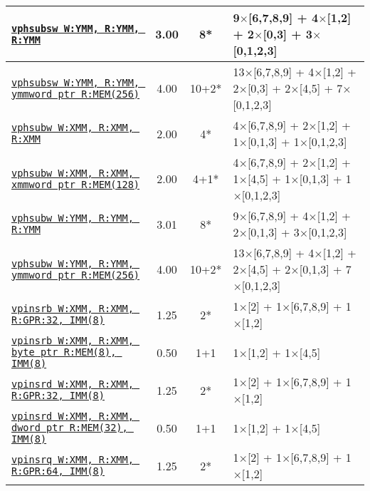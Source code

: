 \documentclass[a4paper,english,fontsize=9]{scrartcl}
\begin{document}
\begin{longtable}{p{}ccL{.25\textwidth}}
  \midrule
  \texttt{\href{https://felixcloutier.com/x86/PHSUBSW.html}{vphsubsw W:YMM, R:YMM, R:YMM}} & 3.00 & 8* & 9\(\times\)[6,7,8,9] + 4\(\times\)[1,2] + 2\(\times\)[0,3] + 3\(\times\)[0,1,2,3] \\
  \midrule
  \texttt{\href{https://felixcloutier.com/x86/PHSUBSW.html}{vphsubsw W:YMM, R:YMM, ymmword ptr R:MEM(256)}} & 4.00 & 10+2* & 13\(\times\)[6,7,8,9] + 4\(\times\)[1,2] + 2\(\times\)[0,3] + 2\(\times\)[4,5] + 7\(\times\)[0,1,2,3] \\
  \midrule
  \texttt{\href{https://felixcloutier.com/x86/PHSUBW:PHSUBD.html}{vphsubw W:XMM, R:XMM, R:XMM}} & 2.00 & 4* & 4\(\times\)[6,7,8,9] + 2\(\times\)[1,2] + 1\(\times\)[0,1,3] + 1\(\times\)[0,1,2,3] \\
  \midrule
  \texttt{\href{https://felixcloutier.com/x86/PHSUBW:PHSUBD.html}{vphsubw W:XMM, R:XMM, xmmword ptr R:MEM(128)}} & 2.00 & 4+1* & 4\(\times\)[6,7,8,9] + 2\(\times\)[1,2] + 1\(\times\)[4,5] + 1\(\times\)[0,1,3] + 1\(\times\)[0,1,2,3] \\
  \midrule
  \texttt{\href{https://felixcloutier.com/x86/PHSUBW:PHSUBD.html}{vphsubw W:YMM, R:YMM, R:YMM}} & 3.01 & 8* & 9\(\times\)[6,7,8,9] + 4\(\times\)[1,2] + 2\(\times\)[0,1,3] + 3\(\times\)[0,1,2,3] \\
  \midrule
  \texttt{\href{https://felixcloutier.com/x86/PHSUBW:PHSUBD.html}{vphsubw W:YMM, R:YMM, ymmword ptr R:MEM(256)}} & 4.00 & 10+2* & 13\(\times\)[6,7,8,9] + 4\(\times\)[1,2] + 2\(\times\)[4,5] + 2\(\times\)[0,1,3] + 7\(\times\)[0,1,2,3] \\
  \midrule
  \texttt{\href{https://felixcloutier.com/x86/PINSRB:PINSRD:PINSRQ.html}{vpinsrb W:XMM, R:XMM, R:GPR:32, IMM(8)}} & 1.25 & 2* & 1\(\times\)[2] + 1\(\times\)[6,7,8,9] + 1\(\times\)[1,2] \\
  \midrule
  \texttt{\href{https://felixcloutier.com/x86/PINSRB:PINSRD:PINSRQ.html}{vpinsrb W:XMM, R:XMM, byte ptr R:MEM(8), IMM(8)}} & 0.50 & 1+1 & 1\(\times\)[1,2] + 1\(\times\)[4,5] \\
  \midrule
  \texttt{\href{https://felixcloutier.com/x86/PINSRB:PINSRD:PINSRQ.html}{vpinsrd W:XMM, R:XMM, R:GPR:32, IMM(8)}} & 1.25 & 2* & 1\(\times\)[2] + 1\(\times\)[6,7,8,9] + 1\(\times\)[1,2] \\
  \midrule
  \texttt{\href{https://felixcloutier.com/x86/PINSRB:PINSRD:PINSRQ.html}{vpinsrd W:XMM, R:XMM, dword ptr R:MEM(32), IMM(8)}} & 0.50 & 1+1 & 1\(\times\)[1,2] + 1\(\times\)[4,5] \\
  \midrule
  \texttt{\href{https://felixcloutier.com/x86/PINSRB:PINSRD:PINSRQ.html}{vpinsrq W:XMM, R:XMM, R:GPR:64, IMM(8)}} & 1.25 & 2* & 1\(\times\)[2] + 1\(\times\)[6,7,8,9] + 1\(\times\)[1,2] \\

\end{longtable}
\end{document}
